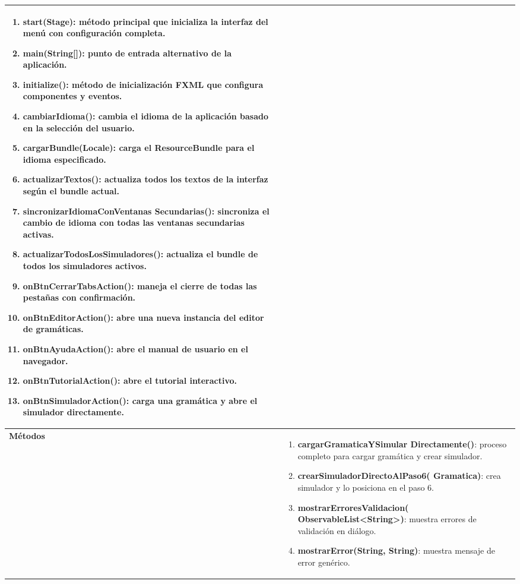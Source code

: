 \begin{longtable}[H]{|>{\columncolor[rgb]{0.63,0.79,0.95}}m{6cm} | m{8.5cm} |}
\begin{enumerate}
    \item \textbf{start(Stage)}: método principal que inicializa la interfaz del menú con configuración completa.
    \item \textbf{main(String[])}: punto de entrada alternativo de la aplicación.
    \item \textbf{initialize()}: método de inicialización FXML que configura componentes y eventos.
    \item \textbf{cambiarIdioma()}: cambia el idioma de la aplicación basado en la selección del usuario.
    \item \textbf{cargarBundle(Locale)}: carga el ResourceBundle para el idioma especificado.
    \item \textbf{actualizarTextos()}: actualiza todos los textos de la interfaz según el bundle actual.
    \item \textbf{sincronizarIdiomaConVentanas Secundarias()}: sincroniza el cambio de idioma con todas las ventanas secundarias activas.
    \item \textbf{actualizarTodosLosSimuladores()}: actualiza el bundle de todos los simuladores activos.
    \item \textbf{onBtnCerrarTabsAction()}: maneja el cierre de todas las pestañas con confirmación.
    \item \textbf{onBtnEditorAction()}: abre una nueva instancia del editor de gramáticas.
    \item \textbf{onBtnAyudaAction()}: abre el manual de usuario en el navegador.
    \item \textbf{onBtnTutorialAction()}: abre el tutorial interactivo.
    \item \textbf{onBtnSimuladorAction()}: carga una gramática y abre el simulador directamente.
\end{enumerate} \\ \hline
\textbf{Métodos} &
\begin{enumerate}
    \item \textbf{cargarGramaticaYSimular Directamente()}: proceso completo para cargar gramática y crear simulador.
    \item \textbf{crearSimuladorDirectoAlPaso6( Gramatica)}: crea simulador y lo posiciona en el paso 6.
    \item \textbf{mostrarErroresValidacion( ObservableList<String>)}: muestra errores de validación en diálogo.
    \item \textbf{mostrarError(String, String)}: muestra mensaje de error genérico.

\end{enumerate}
\end{longtable}
